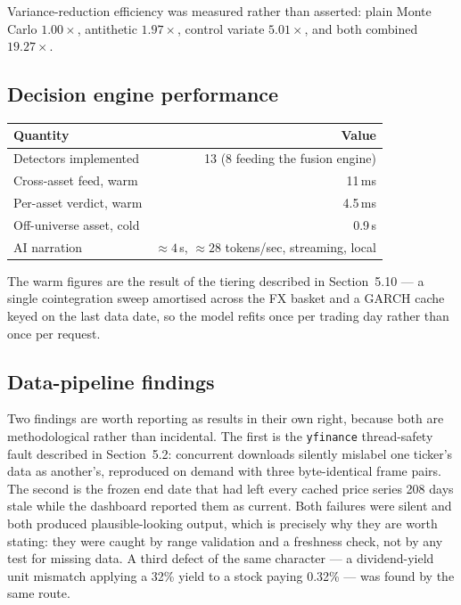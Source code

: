 \documentclass[11pt,a4paper]{article}
\begin{document}
Variance-reduction efficiency was measured rather than asserted: plain Monte Carlo
$1.00\times$, antithetic $1.97\times$, control variate $5.01\times$, and both combined
$\mathbf{19.27\times}$.

\subsection{Decision engine performance}

\begin{center}
\begin{tabular}{lr}
\toprule
\textbf{Quantity} & \textbf{Value} \\
\midrule
Detectors implemented & 13 (8 feeding the fusion engine) \\
Cross-asset feed, warm & 11\,ms \\
Per-asset verdict, warm & 4.5\,ms \\
Off-universe asset, cold & 0.9\,s \\
AI narration & $\approx 4$\,s, $\approx 28$ tokens/sec, streaming, local \\
\bottomrule
\end{tabular}
\end{center}

The warm figures are the result of the tiering described in Section~5.10 --- a single
cointegration sweep amortised across the FX basket and a GARCH cache keyed on the last data
date, so the model refits once per trading day rather than once per request.

\subsection{Data-pipeline findings}

Two findings are worth reporting as results in their own right, because both are
methodological rather than incidental. The first is the \texttt{yfinance} thread-safety
fault described in Section~5.2: concurrent downloads silently mislabel one ticker's data as
another's, reproduced on demand with three byte-identical frame pairs. The second is the
frozen end date that had left every cached price series 208 days stale while the dashboard
reported them as current. Both failures were silent and both produced plausible-looking
output, which is precisely why they are worth stating: they were caught by range validation
and a freshness check, not by any test for missing data. A third defect of the same
character --- a dividend-yield unit mismatch applying a 32\% yield to a stock paying 0.32\%
--- was found by the same route.
\end{document}
